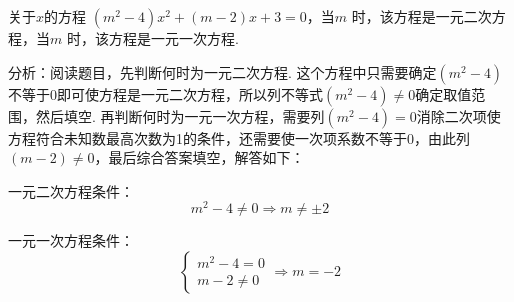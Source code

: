 \documentclass[lang=cn, 10pt, titlestyle=display, oneside]{elegantbook}
\begin{document}
\begin{example}
关于$x$的方程 $(m^2 - 4)x^2 + (m - 2)x + 3 = 0$，当$m$ \underline{\hspace{3.5em}} 时，该方程是一元二次方程，当$m$ \underline{\hspace{3.5em}} 时，该方程是一元一次方程.
\end{example}
\par
\begin{solution}
    分析：阅读题目，先判断何时为一元二次方程. 这个方程中只需要确定$(m^2 - 4)$不等于0即可使方程是一元二次方程，所以列不等式$(m^2 - 4)\ne0$确定取值范围，然后填空. 再判断何时为一元一次方程，需要列$(m^2 - 4)=0$消除二次项使方程符合未知数最高次数为1的条件，还需要使一次项系数不等于0，由此列$(m-2)\ne 0$，最后综合答案填空，解答如下：
    
    一元二次方程条件：
    \[
    m^2 - 4 \neq 0 \Rightarrow m \neq \pm 2
    \]
    
    一元一次方程条件：
    \[
    \begin{cases}
    m^2 - 4 = 0 \\
    m - 2 \neq 0
    \end{cases}
    \Rightarrow m = -2
    \]
\end{solution}
\end{document}
